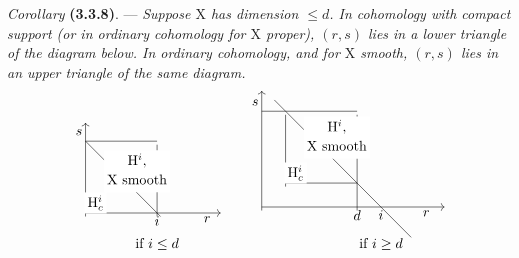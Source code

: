\documentclass[11pt,leqno]{article}
\begin{document}
\textit{Corollary} \textbf{(3.3.8)}. — \textit{Suppose \(\mathrm{X}\) has dimension \(\leq d\). In cohomology with compact support (or in ordinary cohomology for \(\mathrm{X}\) proper), \((r,s)\) lies in a lower triangle of the diagram below. In ordinary cohomology, and for \(\mathrm{X}\) smooth, \((r,s)\) lies in an upper triangle of the same diagram.}
\[
\begin{tikzcd}[
  ampersand replacement=\&,
  baseline=(current bounding box.south),
  row sep=0pt,
  column sep=0pt,
  cells={nodes={inner sep=0pt,outer sep=0pt,minimum size=0pt,text height=0pt,text depth=0pt}},
  arrows={shorten <=0pt,shorten >=0pt}
]
{} \&[1.8cm] {} \&[1.6cm] {}
\\[0.55cm]
{} \arrow[r,no head] \arrow[dr,no head]
\& {} \arrow[d,no head]
\& {}
\\[1.8cm]
{} \arrow[uu,"\textstyle s"{pos=.9,left}]
   \arrow[rr,"\textstyle r"{pos=.9,below}]
   \arrow[r,phantom,"\textstyle i"{pos=1,below}]
   \arrow[r,phantom,"\textstyle\text{if }i\leq d"{pos=1,below,yshift=-.55cm}]
   \arrow[ur,phantom,"\textstyle\mathrm{H}_c^i"{description,pos=.18}]
   \arrow[ur,phantom,"{\begin{gathered}\textstyle\mathrm{H}^i,\\[-.3ex]\textstyle\mathrm{X}\ \text{smooth}\end{gathered}}"{description,pos=.6,xshift=.25cm}]
\& {}
\& {}
\end{tikzcd}
\qquad
\begin{tikzcd}[
  ampersand replacement=\&,
  baseline=(current bounding box.south),
  row sep=0pt,
  column sep=0pt,
  cells={nodes={inner sep=0pt,outer sep=0pt,minimum size=0pt,text height=0pt,text depth=0pt}},
  arrows={shorten <=0pt,shorten >=0pt}
]
{} \&[.6cm] {} \&[1.8cm] {} \&[.6cm] {} \&[1.6cm] {}
\\[.6cm]
{} \arrow[r,no head]
\& {} \arrow[r,no head]
      \arrow[dr,no head,shorten <=-4mm,shorten >=-18mm]
\& {} \arrow[d,no head]
\& {}
\& {}
\\[1.8cm]
{}
\& {} \arrow[u,no head] \arrow[r,no head]
      \arrow[ur,phantom,"\textstyle\mathrm{H}_c^i"{description,pos=.18}]
      \arrow[ur,phantom,"{\begin{gathered}\textstyle\mathrm{H}^i,\\[-.3ex]\textstyle\mathrm{X}\ \text{smooth}\end{gathered}}"{description,pos=.65,xshift=.15cm}]
\& {} \arrow[d,no head]
\& {}
\& {}
\\[.6cm]
{} \arrow[uuu,"\textstyle s"{pos=.9,left}]
   \arrow[rrrr,"\textstyle r"{pos=.9,below}]
   \arrow[rr,phantom,"\textstyle d"{pos=1,below}]
   \arrow[rrr,phantom,"\textstyle i"{pos=1,below}]
   \arrow[rrr,phantom,"\textstyle\text{if }i\geq d"{pos=1,below,yshift=-.7cm}]
\& {}
\& {}
\& {}
\& {}
\end{tikzcd}
\]
\end{document}
